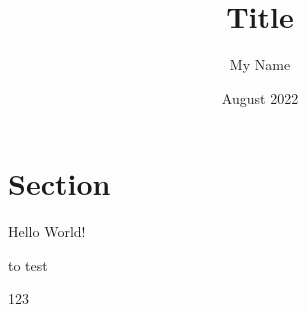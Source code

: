 \documentclass{article}
\title{Title}
\author{My Name}
\date{August 2022}
\begin{document}
\maketitle

\section{Section}

Hello World!

to test

123
\end{document}
